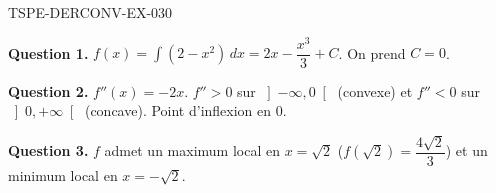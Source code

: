 \begin{corrige}{TSPE-DERCONV-EX-030}

\textbf{Question 1.} $f(x) = \int (2 - x^2)\,dx = 2x - \dfrac{x^3}{3} + C$. On prend $C = 0$.


\textbf{Question 2.} $f''(x) = -2x$. $f'' > 0$ sur $\left]-\infty, 0\right[$ (convexe) et $f'' < 0$ sur $\left]0, +\infty\right[$ (concave). Point d'inflexion en $0$.

\textbf{Question 3.} $f$ admet un maximum local en $x = \sqrt{2}$ ($f(\sqrt{2}) = \dfrac{4\sqrt{2}}{3}$) et un minimum local en $x = -\sqrt{2}$.

\end{corrige}

